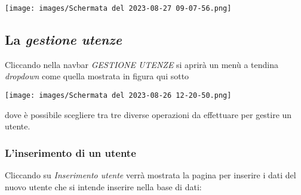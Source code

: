 \documentclass{article}
\begin{document}
    \texttt{[image: images/Schermata del 2023-08-27 09-07-56.png]}

    \pagebreak

    \subsection{La \textit{gestione utenze}}

    Cliccando nella navbar \textit{GESTIONE UTENZE} si aprirà un menù a tendina \textit{dropdown} come quella mostrata in figura qui sotto
    \begin{center}
        \texttt{[image: images/Schermata del 2023-08-26 12-20-50.png]}
    \end{center}
    dove è possibile scegliere tra tre diverse operazioni da effettuare per gestire un utente.
    \subsubsection{L'inserimento di un utente}
    Cliccando su \textit{Inserimento utente} verrà mostrata la pagina per inserire i dati del nuovo utente che si intende inserire nella base di dati:
\end{document}
